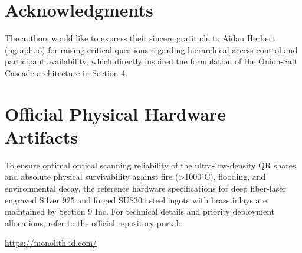 \documentclass[11pt,a4paper,titlepage]{article}
\newif\ifja
\begin{document}
\section*{%
  \ifja 謝辞 \else Acknowledgments \fi
}
\ifja
著者らは、階層的アクセス制御および権限レベルの可用性に関する鋭い技術的問いを投げかけ、第4節「オニオン・ソルト・カスケード」の定式化への契機を提供してくださった Aidan Herbert 氏（ngraph.io / 分散アイデンティティ・トランザクション研究者）に心より感謝の意を表する。
\else
The authors would like to express their sincere gratitude to Aidan Herbert (ngraph.io) for raising critical questions regarding hierarchical access control and participant availability, which directly inspired the formulation of the Onion-Salt Cascade architecture in Section 4.
\fi

\section*{%
  \ifja 公式物理ハードウェアトークン \else Official Physical Hardware Artifacts \fi
}
\ifja
本プロトコル仕様が要求する超低密度QRコードの光学的読取信頼性、および1000℃超の火災・水害・経年腐食への耐性を担保するため、純銀（Silver 925）および鍛造ステンレス（SUS304真鍮象嵌）にファイバーレーザー深彫り・硫黄黒化加工を施した公式エスクロー規格を策定している。
仕様・先行配備ロットの詳細は公式ポータルを参照のこと：
\begin{center}
  \url{https://monolith-id.com/}
\end{center}
\else
To ensure optimal optical scanning reliability of the ultra-low-density QR shares and absolute physical survivability against fire (>1000$^\circ$C), flooding, and environmental decay, the reference hardware specifications for deep fiber-laser engraved Silver 925 and forged SUS304 steel ingots with brass inlays are maintained by Section 9 Inc.
For technical details and priority deployment allocations, refer to the official repository portal:
\begin{center}
  \url{https://monolith-id.com/}
\end{center}
\fi
\end{document}
